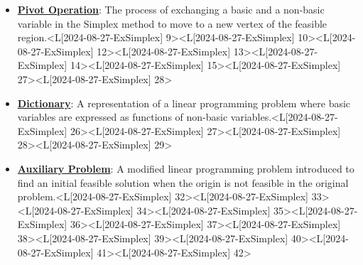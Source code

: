 \documentclass{article}%
\begin{document}
\begin{itemize}[[leftmargin=*]]
\item \href{https://www.math.purdue.edu/~yipn/421/2024-08-27-ExSimplex.pdf#page=9}{\textbf{Pivot Operation}}: The process of exchanging a basic and a non-basic variable in the Simplex method to move to a new vertex of the feasible region.<L[2024-08-27-ExSimplex] 9><L[2024-08-27-ExSimplex] 10><L[2024-08-27-ExSimplex] 12><L[2024-08-27-ExSimplex] 13><L[2024-08-27-ExSimplex] 14><L[2024-08-27-ExSimplex] 15><L[2024-08-27-ExSimplex] 27><L[2024-08-27-ExSimplex] 28>%
\item \href{https://www.math.purdue.edu/~yipn/421/2024-08-27-ExSimplex.pdf#page=26}{\textbf{Dictionary}}: A representation of a linear programming problem where basic variables are expressed as functions of non-basic variables.<L[2024-08-27-ExSimplex] 26><L[2024-08-27-ExSimplex] 27><L[2024-08-27-ExSimplex] 28><L[2024-08-27-ExSimplex] 29>%
\item \href{https://www.math.purdue.edu/~yipn/421/2024-08-27-ExSimplex.pdf#page=32}{\textbf{Auxiliary Problem}}: A modified linear programming problem introduced to find an initial feasible solution when the origin is not feasible in the original problem.<L[2024-08-27-ExSimplex] 32><L[2024-08-27-ExSimplex] 33><L[2024-08-27-ExSimplex] 34><L[2024-08-27-ExSimplex] 35><L[2024-08-27-ExSimplex] 36><L[2024-08-27-ExSimplex] 37><L[2024-08-27-ExSimplex] 38><L[2024-08-27-ExSimplex] 39><L[2024-08-27-ExSimplex] 40><L[2024-08-27-ExSimplex] 41><L[2024-08-27-ExSimplex] 42>%
\end{itemize}%
\newpage

%
\end{document}
